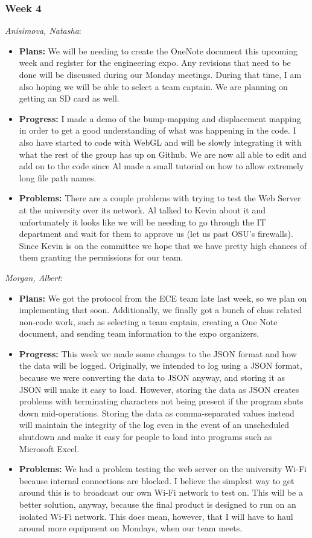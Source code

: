 \documentclass[10pt,draftclsnofoot,onecolumn]{IEEEtran}
\newcommand{\subsubsubsection}[1]{
	\hfill\break\textit{#1}:
}
\begin{document}
\subsubsection{Week 4}
\subsubsubsection{Anisimova, Natasha}
\begin{itemize}
	\item \textbf{Plans: }
	We will be needing to create the OneNote document this upcoming week and register for the engineering expo. Any revisions that need to be done will be discussed during our Monday meetings. During that time, I am also hoping we will be able to select a team captain. We are planning on getting an SD card as well.
	\item \textbf{Progress: }
	I made a demo of the bump-mapping and displacement mapping in order to get a good understanding of what was happening in the code. I also have started to code with WebGL and will be slowly integrating it with what the rest of the group has up on Github. We are now all able to edit and add on to the code since Al made a small tutorial on how to allow extremely long file path names.
	\item \textbf{Problems: }
	There are a couple problems with trying to test the Web Server at the university over its network. Al talked to Kevin about it and unfortunately it looks like we will be needing to go through the IT department and wait for them to approve us (let us past OSU's firewalls). Since Kevin is on the committee we hope that we have pretty high chances of them granting the permissions for our team.
\end{itemize}
\subsubsubsection{Morgan, Albert}
\begin{itemize}
	\item \textbf{Plans: }
	We got the protocol from the ECE team late last week, so we plan on implementing that soon. Additionally, we finally got a bunch of class related non-code work, such as selecting a team captain, creating a One Note document, and sending team information to the expo organizers.
	\item \textbf{Progress: }
	This week we made some changes to the JSON format and how the data will be logged. Originally, we intended to log using a JSON format, because we were converting the data to JSON anyway, and storing it as JSON will make it easy to load. However, storing the data as JSON creates problems with terminating characters not being present if the program shuts down mid-operations. Storing the data as comma-separated values instead will maintain the integrity of the log even in the event of an unscheduled shutdown and make it easy for people to load into programs such as Microsoft Excel.
	\item \textbf{Problems: }
	We had a problem testing the web server on the university Wi-Fi because internal connections are blocked. I believe the simplest way to get around this is to broadcast our own Wi-Fi network to test on. This will be a better solution, anyway, because the final product is designed to run on an isolated Wi-Fi network. This does mean, however, that I will have to haul around more equipment on Mondays, when our team meets.
\end{itemize}
\end{document}
